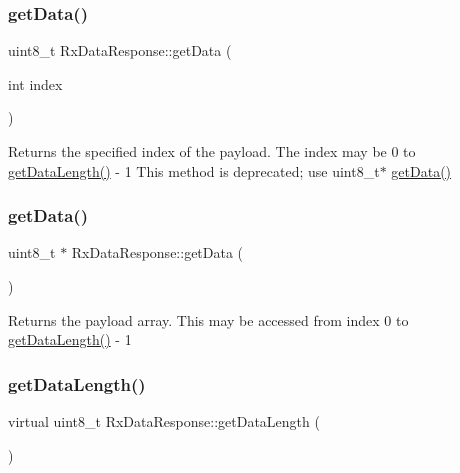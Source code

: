 \subsubsection{\texorpdfstring{get\+Data()}{getData()}\hspace{0.1cm}{\footnotesize\ttfamily [1/2]}}
{\footnotesize\ttfamily uint8\+\_\+t Rx\+Data\+Response\+::get\+Data (\begin{DoxyParamCaption}\item[{int}]{index }\end{DoxyParamCaption})}

Returns the specified index of the payload. The index may be 0 to \hyperlink{class_rx_data_response_a5845e6a0719fd0bf52675e47053a704e}{get\+Data\+Length()} -\/ 1 This method is deprecated; use uint8\+\_\+t$\ast$ \hyperlink{class_rx_data_response_ae0f858fe479a07c7122a8d414c60517e}{get\+Data()} \hypertarget{class_rx_data_response_ae0f858fe479a07c7122a8d414c60517e}{}\label{class_rx_data_response_ae0f858fe479a07c7122a8d414c60517e} 
\subsubsection{\texorpdfstring{get\+Data()}{getData()}\hspace{0.1cm}{\footnotesize\ttfamily [2/2]}}
{\footnotesize\ttfamily uint8\+\_\+t $\ast$ Rx\+Data\+Response\+::get\+Data (\begin{DoxyParamCaption}{ }\end{DoxyParamCaption})}

Returns the payload array. This may be accessed from index 0 to \hyperlink{class_rx_data_response_a5845e6a0719fd0bf52675e47053a704e}{get\+Data\+Length()} -\/ 1 \hypertarget{class_rx_data_response_a5845e6a0719fd0bf52675e47053a704e}{}\label{class_rx_data_response_a5845e6a0719fd0bf52675e47053a704e} 
\subsubsection{\texorpdfstring{get\+Data\+Length()}{getDataLength()}}
{\footnotesize\ttfamily virtual uint8\+\_\+t Rx\+Data\+Response\+::get\+Data\+Length (\begin{DoxyParamCaption}{ }\end{DoxyParamCaption})\hspace{0.3cm}{\ttfamily [pure virtual]}}

